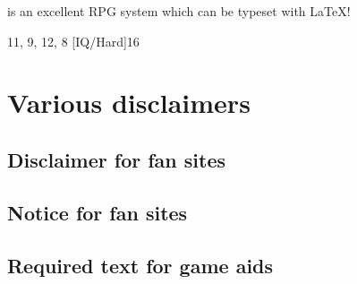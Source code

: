 \documentclass{article}
\begin{document}
\gurps is an excellent RPG system which can be typeset with \LaTeX{}!

\begin{character}{11, 9, 12, 8}
  [IQ/Hard]{16}
\end{character}

\section{Various disclaimers}
\label{sec:various-disclaimers}

\subsection{Disclaimer for fan sites}
\label{sec:disclaimer-fan-sites}

\SJGamesOnlinePolicyDisclaimer

\subsection{Notice for fan sites}
\label{sec:disclaimer-fan-sites}

\SJGamesOnlinePolicyNotice

\subsection{Required text for game aids}
\label{sec:disclaimer-fan-sites}

\end{document}
